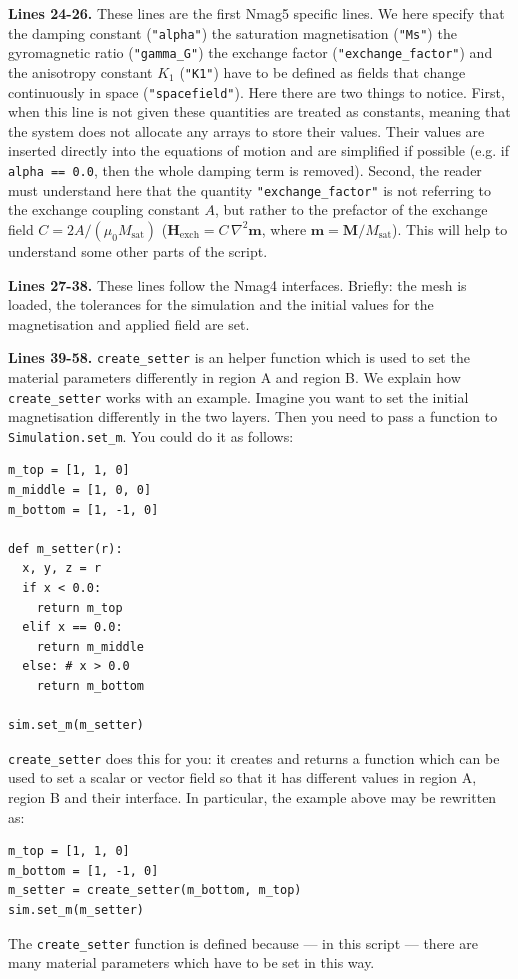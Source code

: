 \documentclass[11pt,oneside,openany]{article}
\newcommand{\Ms}{M_{\mathrm{sat}}}
\begin{document}
\textbf{Lines 24-26.} These lines are the first Nmag5 specific lines.  We here
specify that the damping constant (\verb|"alpha"|) the saturation magnetisation
(\verb|"Ms"|) the gyromagnetic ratio (\verb|"gamma_G"|) the exchange factor
(\verb|"exchange_factor"|) and the anisotropy constant $K_1$ (\verb|"K1"|) have
to be defined as fields that change continuously in space
(\verb|"spacefield"|). Here there are two things to notice. First, when this
line is not given these quantities are treated as constants, meaning that the
system does not allocate any arrays to store their values. Their values are
inserted directly into the equations of motion and are simplified if possible
(e.g. if \verb|alpha == 0.0|, then the whole damping term is removed).  Second,
the reader must understand here that the quantity \verb|"exchange_factor"| is
not referring to the exchange coupling constant $A$, but rather to the
prefactor of the exchange field $C = 2A/(\mu_0 \Ms)$
($\mathbf{H_{\mathrm{exch}}} = C \, \nabla^2 \mathbf{m}$, where $\mathbf{m} =
\mathbf{M}/\Ms$). This will help to understand some other parts of the script.

\textbf{Lines 27-38.} These lines follow the Nmag4 interfaces.
Briefly: the mesh is loaded, the tolerances for the simulation and
the initial values for the magnetisation and applied field are set.

\textbf{Lines 39-58.} \verb|create_setter| is an helper function which is used
to set the material parameters differently in region A and region B.  We
explain how \verb|create_setter| works with an example.  Imagine you want to
set the initial magnetisation differently in the two layers. Then you need to
pass a function to \verb|Simulation.set_m|. You could do it as follows:
\begin{lstlisting}
m_top = [1, 1, 0]
m_middle = [1, 0, 0]
m_bottom = [1, -1, 0]

def m_setter(r):
  x, y, z = r
  if x < 0.0:
    return m_top
  elif x == 0.0:
    return m_middle
  else: # x > 0.0
    return m_bottom

sim.set_m(m_setter)
\end{lstlisting}
\verb|create_setter| does this for you: it creates and returns a function which
can be used to set a scalar or vector field so that it has different values in
region A, region B and their interface. In particular, the example above may be
rewritten as:
\begin{lstlisting}
m_top = [1, 1, 0]
m_bottom = [1, -1, 0]
m_setter = create_setter(m_bottom, m_top)
sim.set_m(m_setter)
\end{lstlisting}
The \verb|create_setter| function is defined because --- in this script ---
there are many material parameters which have to be set in this way.
\end{document}
